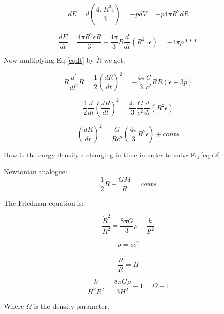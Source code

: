 \documentclass[a4paper, 12pt]{article} %
\begin{document}
\begin{equation}
dE = d(\dfrac{4\pi R^3 \epsilon}{3}) = - pdV = -p 4\pi R^2dR
\end{equation}

\begin{equation}
\dfrac{dE}{dt} = \dfrac{4\pi R^2 \epsilon \dot R}{3} + 
\dfrac{4\pi}{3}R \dfrac{d}{dt}(R^2 \cdot \epsilon) = - 4\pi \rho ***
\end{equation}

Now multiplying Eq.\ref{eq:R} by $\dot{R}$ we get:

\begin{equation}
\dot{R} \dfrac{d^2}{dt^2} R = \dfrac{1}{2}(\dfrac{dR}{dt})^2 = 
- \dfrac{4\pi}{3}\dfrac{G}{c^2}R\dot{R}(\epsilon + 3p)
\end{equation}

\begin{equation}
\dfrac{1}{2}\dfrac{d}{dt}(\dfrac{dR}{dt})^2 = \dfrac{4\pi}{3}\dfrac{G}{c^2}\dfrac{d}{dt} (R^2 \epsilon)
\end{equation}

\begin{equation}\label{eq:r2}
(\dfrac{dR}{dr})^2 = \dfrac{G}{R c^2}(\dfrac{4\pi}{3}R^2 \epsilon) + conts
\end{equation}

How is the enrgy density $\epsilon$ changing in time 
in order to solve Eq.\ref{eq:r2}

Newtonian analogue:
\begin{equation}
\dfrac{1}{2}\dot{R} - \dfrac{GM}{R} = conts
\end{equation}


The Friedman equation is:

\begin{equation}
\dfrac{\dot R ^2}{R^2} = \dfrac{8\pi G}{3}\rho - \dfrac{k}{R^2}
\end{equation}

\begin{equation}
\rho = {\epsilon}{c^2}
\end{equation}

\begin{equation}
\dfrac{\dot{R}}{R} = H 
\end{equation}


\begin{equation}
\dfrac{k}{H^2 R^2} = \dfrac{8 \pi G \rho}{3H^2} - 1 = \Omega -1
\end{equation}

Where $\Omega$ is the density parameter.
\end{document}

